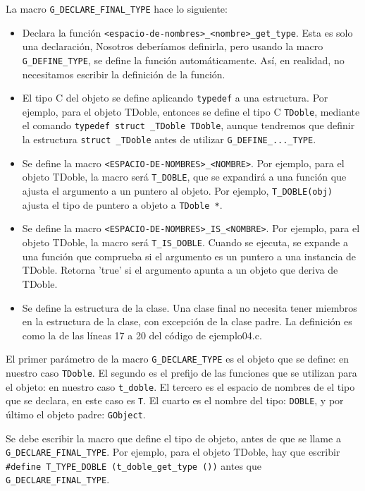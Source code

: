 La macro \texttt{G\_DECLARE\_FINAL\_TYPE} hace lo siguiente:
\begin{itemize}
  \tightlist
\item Declara la función \texttt{<espacio-de-nombres>\_<nombre>\_get\_type}. Esta es solo una declaración,
  Nosotros deberíamos definirla, pero usando la macro \texttt{G\_DEFINE\_TYPE}, se define la función
  automáticamente. Así, en realidad, no necesitamos escribir la definición de la función.
\item El tipo C del objeto se define aplicando \texttt{typedef} a una estructura. Por ejemplo, para el objeto
  \textsf{TDoble}, entonces se define el tipo C \texttt{TDoble}, mediante el comando
  \texttt{typedef struct \_TDoble TDoble}, aunque tendremos que definir la estructura \texttt{struct \_TDoble}
  antes de utilizar \texttt{G\_DEFINE\_...\_TYPE}.
\item Se define la macro \texttt{<ESPACIO-DE-NOMBRES>\_<NOMBRE>}. Por ejemplo, para el objeto
  \textsf{TDoble}, la macro será \texttt{T\_DOBLE}, que se expandirá a una función que ajusta el argumento
  a un puntero al objeto. Por ejemplo, \texttt{T\_DOBLE(obj)} ajusta el tipo de puntero a objeto a
  \texttt{TDoble *}.
\item Se define la macro \texttt{<ESPACIO-DE-NOMBRES>\_IS\_<NOMBRE>}. Por ejemplo, para el objeto
  \textsf{TDoble}, la macro será \texttt{T\_IS\_DOBLE}. Cuando se ejecuta, se expande a una función que
  comprueba si el argumento es un puntero a una instancia de \textsf{TDoble}. Retorna 'true' si el argumento
  apunta a un objeto que deriva de \textsf{TDoble}.
\item Se define la estructura de la clase. Una clase final no necesita tener miembros en la estructura de la clase,
  con excepción de la clase padre. La definición es como la de las líneas 17 a 20 del código de  ejemplo04.c.
\end{itemize}

El primer parámetro de la macro \texttt{G\_DECLARE\_TYPE} es el objeto que se define: en nuestro
caso \texttt{TDoble}. El segundo es el prefijo de las funciones que se utilizan para el objeto: en nuestro
caso \texttt{t\_doble}. El tercero es el espacio de nombres de el tipo que se declara, en este caso es
\texttt{T}. El cuarto es el nombre del tipo: \texttt{DOBLE}, y por último el objeto padre: \texttt{GObject}.

Se debe escribir la macro que define el tipo de objeto, antes de que se llame a
\texttt{G\_DECLARE\_FINAL\_TYPE}. Por ejemplo, para el objeto \textsf{TDoble}, hay que escribir
\texttt{\#define T\_TYPE\_DOBLE (t\_doble\_get\_type ())} antes que \texttt{G\_DECLARE\_FINAL\_TYPE}.

